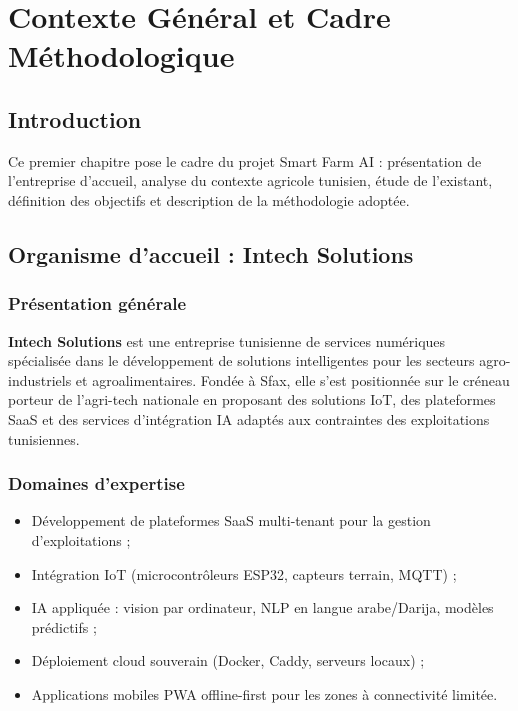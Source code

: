 \chapter{Contexte Général et Cadre Méthodologique}
\section*{Introduction}

Ce premier chapitre pose le cadre du projet Smart Farm AI : présentation
de l'entreprise d'accueil, analyse du contexte agricole tunisien, étude
de l'existant, définition des objectifs et description de la méthodologie
adoptée.

\section{Organisme d'accueil : Intech Solutions}

\subsection{Présentation générale}
\textbf{Intech Solutions} est une entreprise tunisienne de services numériques
spécialisée dans le développement de solutions intelligentes pour les secteurs
agro-industriels et agroalimentaires. Fondée à Sfax, elle s'est positionnée
sur le créneau porteur de l'agri-tech nationale en proposant des solutions
IoT, des plateformes SaaS et des services d'intégration IA adaptés aux
contraintes des exploitations tunisiennes.

\subsection{Domaines d'expertise}
\begin{itemize}
  \item Développement de plateformes SaaS multi-tenant pour la gestion d'exploitations ;
  \item Intégration IoT (microcontrôleurs ESP32, capteurs terrain, MQTT) ;
  \item IA appliquée : vision par ordinateur, NLP en langue arabe/Darija, modèles prédictifs ;
  \item Déploiement cloud souverain (Docker, Caddy, serveurs locaux) ;
  \item Applications mobiles PWA offline-first pour les zones à connectivité limitée.
\end{itemize}

